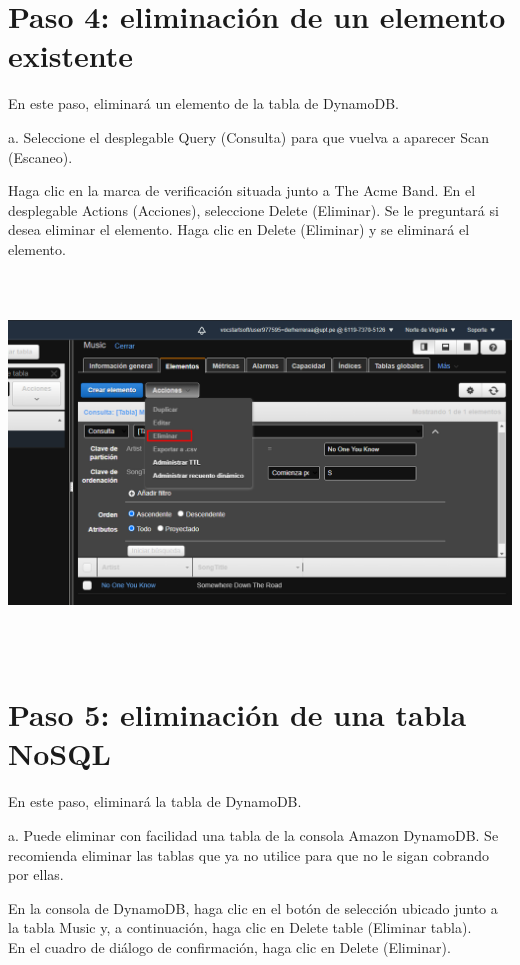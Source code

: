 \documentclass[12pt,letterpaper]{article}
\begin{document}
\section{Paso 4: eliminación de un elemento existente
} 

En este paso, eliminará un elemento de la tabla de DynamoDB.

a. Seleccione el desplegable Query (Consulta) para que vuelva a aparecer Scan (Escaneo).  

Haga clic en la marca de verificación situada junto a The Acme Band. En el desplegable Actions (Acciones), seleccione Delete (Eliminar). Se le preguntará si desea eliminar el elemento. Haga clic en Delete (Eliminar) y se eliminará el elemento.
\begin{center}
    \includegraphics[width=18cm, height=10cm]{img/4A.png}  
\end{center}
\newpage
\section{Paso 5: eliminación de una tabla NoSQL
} 

En este paso, eliminará la tabla de DynamoDB.

a. Puede eliminar con facilidad una tabla de la consola Amazon DynamoDB. Se recomienda eliminar las tablas que ya no utilice para que no le sigan cobrando por ellas.

En la consola de DynamoDB, haga clic en el botón de selección ubicado junto a la tabla Music y, a continuación, haga clic en Delete table (Eliminar tabla).
\\En el cuadro de diálogo de confirmación, haga clic en Delete (Eliminar).
\end{document}
